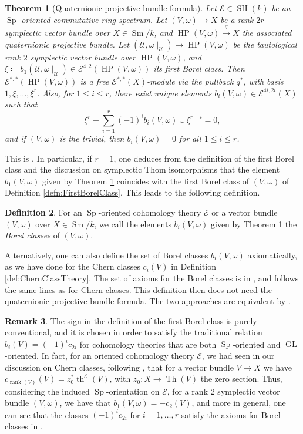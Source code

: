 \documentclass[10pt]{amsart}
\theoremstyle{definition}
\newtheorem{defn}{Definition}[section]
\newtheorem{rmk}[defn]{Remark}
\theoremstyle{plain}
\newtheorem{thm}[defn]{Theorem}
\numberwithin{equation}{section}
\newcommand{\0}{\emptyset}
\newcommand{\sE}{{\mathcal E}}
\newcommand{\GL}{{\operatorname{GL}}}
\newcommand{\Sp}{{\operatorname{Sp}}}
\newcommand{\HP}{{\operatorname{HP}}}
\newcommand{\SH}{{\operatorname{SH}}}
\newcommand{\Th}{{\operatorname{Th}}}
\newcommand{\Sm}{{\operatorname{Sm}}}
\renewcommand{\th}{{\operatorname{th}}}
\newcommand{\rnk}{{\operatorname{rank}}}
\begin{document}
\begin{thm}[Quaternionic projective bundle formula]
\label{thm:QuatProjBundle}
    Let $\sE \in \SH(k)$ be an $\Sp$-oriented commutative ring spectrum. Let $(V,\omega) \to X$ be a rank $2r$ symplectic vector bundle over $X \in \Sm/k$, and $\HP(V,\omega) \xrightarrow{q}X$ the associated quaternionic projective bundle. Let $(\mathcal{U}, \omega \mid_{\mathcal{U}})\to \HP(V,\omega)$ be the tautological rank $2$ symplectic vector bundle over $\HP(V,\omega)$, and $\xi \coloneqq b_1(\mathcal{U}, \omega \mid_{\mathcal{U}}) \in \sE^{4,2}(\HP(V,\omega))$ its first Borel class. Then $\sE^{*,*}(\HP(V,\omega))$ is a free $\sE^{*,*}(X)$-module via the pullback $q^*$, with basis $1, \xi, \ldots, \xi^r$. Also, for $1\le i \le r$, there exist unique elements $b_i(V,\omega) \in \sE^{4i,2i}(X)$ 
    such that
    $$\xi^r + \sum_{i=1}^r(-1)^ib_i(V,\omega) \cup \xi^{r-i}=0,$$
    and if $(V,\omega)$ is the trivial, then $b_i(V,\omega)=0$ for all $1\le i \le r$. 
\end{thm}

This is \cite[Theorem 8.2]{panwal:grass}. In particular, if $r=1$, one deduces from the definition of the first Borel class and the discussion on symplectic Thom isomorphisms that the element $b_1(V,\omega)$ given by Theorem \ref{thm:QuatProjBundle} coincides with the first Borel class of $(V,\omega)$ of Definition \ref{defn:FirstBorelClass}. This leads to the following definition.
\begin{defn}
    For an $\Sp$-oriented cohomology theory $\sE$ or a vector bundle $(V,\omega)$ over $X \in \Sm/k$, we call the elements $b_i(V,\omega)$ given by Theorem \ref{thm:QuatProjBundle} the \emph{Borel classes} of $(V,\omega)$.
\end{defn}
Alternatively, one can also define the set of Borel classes $b_i(V,\omega)$ axiomatically, as we have done for the Chern classes $c_i(V)$ in Definition \ref{def:ChernClassTheory}. The set of axioms for the Borel classes is in \cite[Definition 14.1]{panwal:grass}, and follows the same lines as for Chern classes. This definition then does not need the quaternionic projective bundle formula. The two approaches are equivalent by \cite[Theorem 14.4]{panwal:grass}.

\begin{rmk}
    The sign in the definition of the first Borel class is purely conventional, and it is chosen in order to satisfy the traditional relation $b_i(V)=(-1)^ic_{2i}$ for cohomology theories that are both $\Sp$-oriented and $\GL$-oriented. In fact, for an oriented cohomology theory $\sE$, we had seen in our discussion on Chern classes, following \cite{Pan:oriented}, that for a vector bundle $V\to X$ we have $c_{\rnk(V)}(V)=z_0^*\th^\sE(V)$, with $z_0:X \to \Th(V)$ the zero section. Thus, considering the induced $\Sp$-orientation on $\sE$, for a rank $2$ symplectic vector bundle $(V,\omega)$, we have that $b_1(V,\omega)=-c_2(V)$, and more in general, one can see that the classes $(-1)^ic_{2i}$ for $i=1, \ldots, r$ satisfy the axioms for Borel classes in \cite[Definition 14.1]{panwal:grass}.
\end{rmk}
\end{document}
